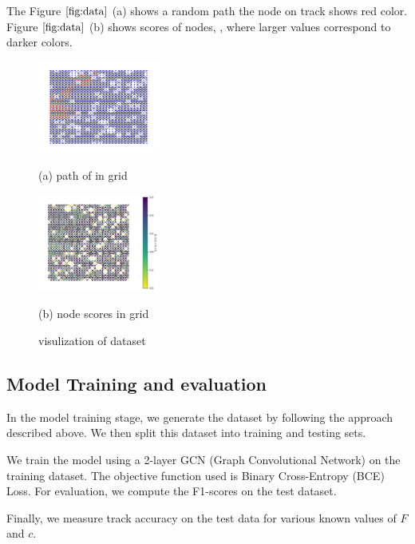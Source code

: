 \documentclass{article}
\begin{document}
The Figure $\ref{fig:data}$ (a) shows a random path the node on track shows red color.
Figure $\ref{fig:data}$ (b) shows scores of nodes, , where larger values correspond to darker colors.

\begin{figure}[htb]
  \begin{minipage}[b]{1.0\linewidth}
    \centering
    \centerline{\includegraphics[width=4.0cm]{images/path}}
    \centerline{(a) path of in grid}\medskip
  \end{minipage}
  \hfill
  \begin{minipage}[b]{1.0\linewidth}
    \centering
    \centerline{\includegraphics[width=4.0cm]{images/scores}}
    \centerline{(b) node scores in grid }\medskip
  \end{minipage}
  \caption{visulization of dataset}
  \label{fig:data}
  \end{figure}

  \subsection{Model Training and evaluation}
  \label{ssec:model}

  In the model training stage, we generate the dataset by following the approach described above. We then split this dataset into training and testing sets.

  We train the model using a 2-layer GCN (Graph Convolutional Network) on the training dataset. The objective function used is Binary Cross-Entropy (BCE) Loss.
  For evaluation, we compute the F1-scores on the test dataset.

  Finally, we measure track accuracy on the test data for various known values of $F$ and $c$.
\end{document}
